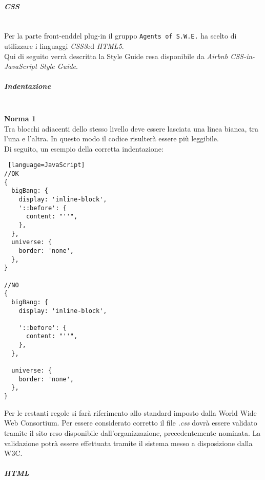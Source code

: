 \paragraph{\textit{CSS}}
\label{css} \-\\
Per la parte front-end\glossario del plug-in il gruppo \texttt{Agents of S.W.E.} ha scelto di utilizzare i linguaggi \textit{CSS3}\glossario ed \textit{HTML5}\glossario.\\
Qui di seguito verrà descritta la Style Guide resa disponibile da \textit{Airbnb CSS-in-JavaScript Style Guide}.

\subparagraph{Indentazione} \-\\
\textbf{Norma 1}\\
Tra blocchi adiacenti dello stesso livello deve essere lasciata una linea bianca, tra l'una e l'altra. In questo modo il codice risulterà essere più leggibile. \\
Di seguito, un esempio della corretta indentazione: 


\begin{lstlisting} [language=JavaScript]
//OK
{
  bigBang: {
    display: 'inline-block',
    '::before': {
      content: "''",
    },
  },
  universe: {
    border: 'none',
  },
}

//NO
{
  bigBang: {
    display: 'inline-block',

    '::before': {
      content: "''",
    },
  },

  universe: {
    border: 'none',
  },
}
\end{lstlisting}

Per le restanti regole si farà riferimento allo standard imposto dalla World Wide Web Consortium. Per essere considerato corretto il file \textit{.css} dovrà essere validato tramite il sito reso disponibile dall'organizzazione, precedentemente nominata. La validazione potrà essere effettuata tramite il sistema messo a disposizione dalla W3C.

\paragraph{\textit{HTML}}
\label{html}\-\\

